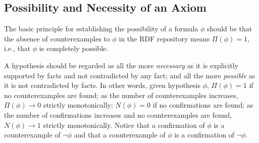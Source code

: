 \documentclass[conference]{IEEEtran}
\begin{document}
%
%


\subsection{Possibility and Necessity of an Axiom}


The basic principle for establishing the possibility of a formula $\phi$ should be
that the absence of counterexamples to $\phi$ in the RDF repository means $\Pi(\phi) = 1$,
i.e., that $\phi$ is completely possible.

A hypothesis should be regarded as all the more
\emph{necessary} as it is explicitly supported by facts and not contradicted by any fact;
and all the more \emph{possible} as it is not contradicted by facts.
In other words, given hypothesis $\phi$, $\Pi(\phi) = 1$ if no counterexamples are found; 
as the number of counterexamples increases, $\Pi(\phi) \to 0$ strictly monotonically;
$N(\phi) = 0$ if no confirmations are found; as the number of confirmations increases
and no counterexamples are found, $N(\phi) \to 1$ strictly monotonically.
Notice that a confirmation of $\phi$ is a counterexample of $\neg\phi$
and that a counterexample of $\phi$ is a confirmation of $\neg\phi$.
\end{document}
